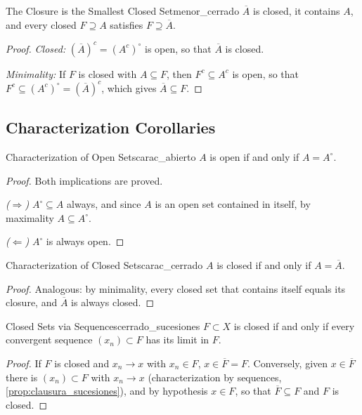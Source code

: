\documentclass[11pt, a4paper]{article}
\begin{document}
\begin{proposicion}{The Closure is the Smallest Closed Set}{menor_cerrado}
$\overline{A}$ is closed, it contains $A$, and every closed $F \supseteq A$ satisfies
$F \supseteq \overline{A}$.
\end{proposicion}

\begin{proof}
\textit{Closed:} $(\overline{A})^c = (A^c)^\circ$ is open, so that $\overline{A}$ is closed.

\textit{Minimality:} If $F$ is closed with $A \subseteq F$, then $F^c \subseteq A^c$ is open,
so that $F^c \subseteq (A^c)^\circ = (\overline{A})^c$, which gives $\overline{A} \subseteq F$.
\end{proof}

\subsection{Characterization Corollaries}

\begin{corolario}{Characterization of Open Sets}{carac_abierto}
$A$ is open if and only if $A = A^\circ$.

\begin{proof}
Both implications are proved.

\textit{($\Rightarrow$)} $A^\circ \subseteq A$ always, and since $A$ is an open set contained in itself, by
maximality $A \subseteq A^\circ$.

\textit{($\Leftarrow$)} $A^\circ$ is always open.
\end{proof}
\end{corolario}

\begin{corolario}{Characterization of Closed Sets}{carac_cerrado}
$A$ is closed if and only if $A = \overline{A}$.

\begin{proof}
Analogous: by minimality, every closed set that contains itself equals its closure, and
$\overline{A}$ is always closed.
\end{proof}
\end{corolario}

\begin{corolario}{Closed Sets via Sequences}{cerrado_sucesiones}
$F \subset X$ is closed if and only if every convergent sequence $(x_n) \subset F$ has its
limit in $F$.

\begin{proof}
If $F$ is closed and $x_n \to x$ with $x_n \in F$, $x \in \overline{F} = F$. Conversely, given
$x \in \overline{F}$ there is $(x_n) \subset F$ with $x_n \to x$ (characterization by sequences,
\ref{prop:clausura_sucesiones}), and by
hypothesis $x \in F$, so that $\overline{F} \subseteq F$ and $F$ is closed.
\end{proof}
\end{corolario}
\end{document}
